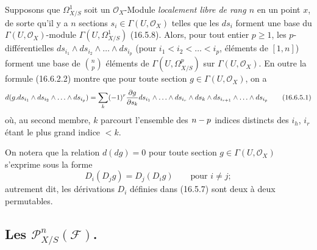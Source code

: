 \begin{env}[16.6.5]
\label{IV.16.6.5}
Supposons que $\boldsymbol{\varOmega}_{X/S}^1$ soit un $\mathcal{O}_X$-Module \emph{localement libre
de rang $n$} en un point $x$, de sorte qu'il y a $n$ sections
$s_i\in\Gamma(U,\mathcal{O}_X)$ telles que les $ds_i$ forment une base du
$\Gamma(U,\mathcal{O}_X)$-module $\Gamma(U,\varOmega_{X/S}^1)$ (16.5.8).
Alors, pour tout entier $p\geq1$, les $p$-différentielles
$ds_{i_1}\wedge ds_{i_2}\wedge\ldots\wedge ds_{i_p}$ (pour
$i_1<i_2<\ldots<i_p$, éléments de $[1,n]$) forment une base de
$\binom{n}{p}$ éléments de $\Gamma(U,\varOmega_{X/S}^p)$ sur
$\Gamma(U,\mathcal{O}_X)$. En outre la formule (16.6.2.2) montre que pour
toute section $g\in\Gamma(U,\mathcal{O}_X)$, on a
\[
  d(g.ds_{i_1}\wedge ds_{i_2}\wedge\ldots\wedge ds_{i_p})
  =\sum_k(- 1)^r\frac{\partial g}{\partial s_k}
  ds_{i_1}\wedge\ldots\wedge ds_{i_r}\wedge ds_k\wedge
  ds_{i_{r+1}}\wedge\ldots\wedge ds_{i_p}
  \tag{16.6.5.1}
  \label{IV.16.6.5.1}
\]
où, au second membre, $k$ parcourt l'ensemble des $n- p$ indices distincts des
$i_h$, $i_r$ étant le plus grand indice $<k$.

On notera que la relation $d(dg)=0$ pour toute section
$g\in\Gamma(U,\mathcal{O}_X)$ s'exprime sous la forme
\[
  D_i(D_jg)=D_j(D_ig)\qquad\text{pour $i\neq j$};
\]
autrement dit, les dérivations $D_i$ définies dans (16.5.7) sont deux à deux
permutables.
\end{env}

\subsection{\texorpdfstring{Les $\mathscr{P}_{X/S}^n(\mathscr{F})$.}{Les P\string_\string^n(F).}}

